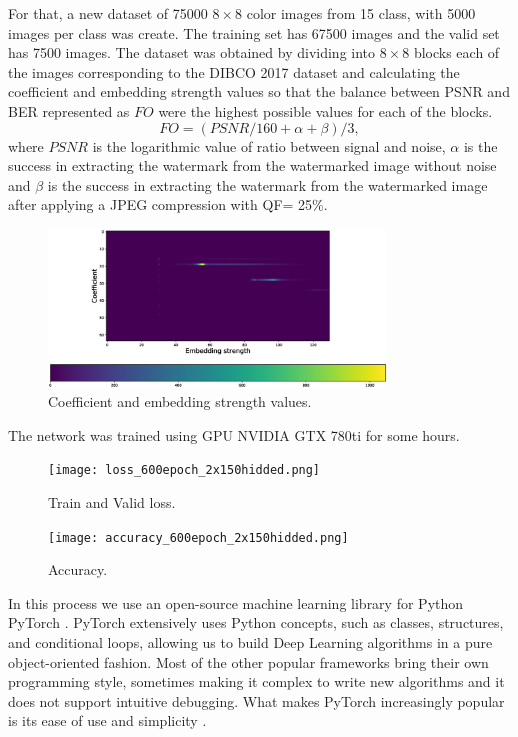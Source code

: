 \documentclass[runningheads]{llncs}
\begin{document}
For that, a new dataset of 75000 $8\times 8$ color images from 15 class, with 5000 images per class was create. The training set has 67500 images and the valid set has 7500 images. The dataset was obtained by dividing into $8\times 8$ blocks each of the images corresponding to the DIBCO 2017 dataset and calculating the coefficient and embedding strength values so that the balance between PSNR and BER represented as $FO$ were the highest possible values for each of the blocks.
\begin{equation}
FO = (PSNR/160 + \alpha + \beta)/3,
\label{FA}
\end{equation}
where $PSNR$ is the logarithmic value of ratio between signal and noise, $ \alpha $ is the success in extracting the watermark from the watermarked image without noise and $ \beta $ is the success in extracting the watermark from the watermarked image after applying a JPEG compression with QF= 25{\%}.
\begin{figure} [H]
	\begin{center}
		\includegraphics[width=0.8\textwidth]{colorbar.eps}
		\caption{Coefficient and embedding strength values.} \label{colormap}
	\end{center}
\end{figure}

The network was trained using GPU NVIDIA GTX 780ti for some hours.
\begin{figure}
	\begin{center}
		\texttt{[image: loss\_600epoch\_2x150hidded.png]}
		\caption{Train and Valid loss.} \label{loss}
	\end{center}
\end{figure} 
\begin{figure}
\begin{center}
	\texttt{[image: accuracy\_600epoch\_2x150hidded.png]}
	\caption{Accuracy.} \label{acc}
\end{center}
\end{figure}

In this process we use an open-source machine learning library for Python PyTorch \cite{paszke2017pytorch}. PyTorch extensively uses Python concepts, such as classes, structures, and conditional loops, allowing us to build Deep Learning algorithms in a pure object-oriented fashion. Most of the other popular frameworks bring their own programming style, sometimes making it complex to write new algorithms and it does not support intuitive debugging. What makes PyTorch increasingly popular is its ease of use and simplicity \cite{Subramanian2018}.
\end{document}
